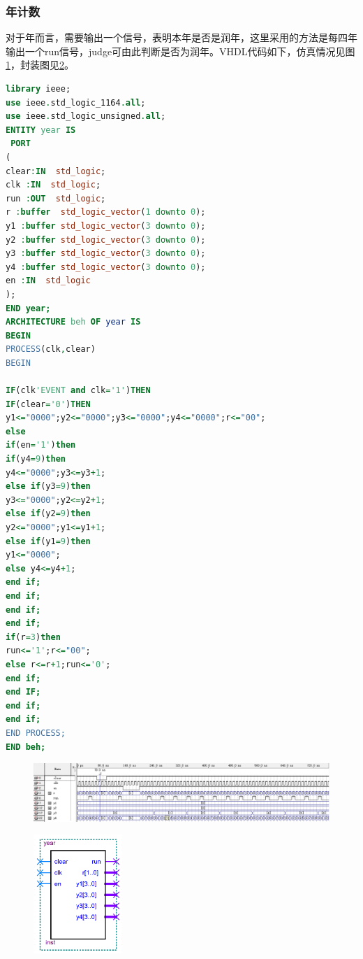 \documentclass[12pt]{article}
\begin{document}
\subsubsection{年计数}
对于年而言，需要输出一个信号，表明本年是否是润年，这里采用的方法是每四年输出一个run信号，judge可由此判断是否为润年。VHDL代码如下，仿真情况见图\ref{fig:fzyear}，封装图见\ref{fig:fengzhuangyear}。
\begin{lstlisting}[language=VHDL]
library ieee;
use ieee.std_logic_1164.all;
use ieee.std_logic_unsigned.all;
ENTITY year IS 
 PORT
(
clear:IN  std_logic;
clk :IN  std_logic;
run :OUT  std_logic;
r :buffer  std_logic_vector(1 downto 0);
y1 :buffer std_logic_vector(3 downto 0);
y2 :buffer std_logic_vector(3 downto 0);
y3 :buffer std_logic_vector(3 downto 0);
y4 :buffer std_logic_vector(3 downto 0);
en :IN  std_logic
);
END year;
ARCHITECTURE beh OF year IS
BEGIN
PROCESS(clk,clear)
BEGIN

IF(clk'EVENT and clk='1')THEN
IF(clear='0')THEN
y1<="0000";y2<="0000";y3<="0000";y4<="0000";r<="00";
else
if(en='1')then
if(y4=9)then
y4<="0000";y3<=y3+1;
else if(y3=9)then
y3<="0000";y2<=y2+1;
else if(y2=9)then
y2<="0000";y1<=y1+1;
else if(y1=9)then
y1<="0000";
else y4<=y4+1;
end if;
end if;
end if;
end if;
if(r=3)then
run<='1';r<="00";
else r<=r+1;run<='0';
end if;
end IF;
end if;
end if;
END PROCESS;
END beh;
\end{lstlisting}
\begin{figure}[hp]
	\centering  
	\includegraphics[width=\textwidth]{picture/fzyear.png} 
	\caption{}
	\label{fig:fzyear}   
\end{figure}
\begin{figure}[hp]
	\centering  
	\includegraphics[width=0.3\textwidth]{picture/yearfz.png} 
	\caption{}
	\label{fig:fengzhuangyear}   
\end{figure}
\end{document}
